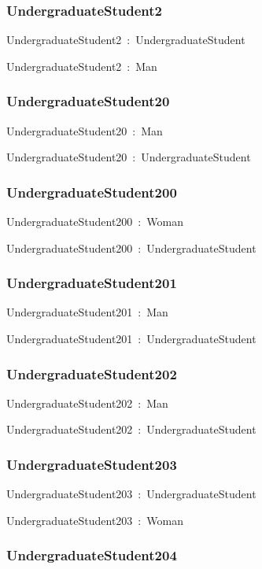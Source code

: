 \documentclass{article}
\begin{document}
\subsubsection*{UndergraduateStudent2}

UndergraduateStudent2~:~UndergraduateStudent

UndergraduateStudent2~:~Man

\subsubsection*{UndergraduateStudent20}

UndergraduateStudent20~:~Man

UndergraduateStudent20~:~UndergraduateStudent

\subsubsection*{UndergraduateStudent200}

UndergraduateStudent200~:~Woman

UndergraduateStudent200~:~UndergraduateStudent

\subsubsection*{UndergraduateStudent201}

UndergraduateStudent201~:~Man

UndergraduateStudent201~:~UndergraduateStudent

\subsubsection*{UndergraduateStudent202}

UndergraduateStudent202~:~Man

UndergraduateStudent202~:~UndergraduateStudent

\subsubsection*{UndergraduateStudent203}

UndergraduateStudent203~:~UndergraduateStudent

UndergraduateStudent203~:~Woman

\subsubsection*{UndergraduateStudent204}
\end{document}
